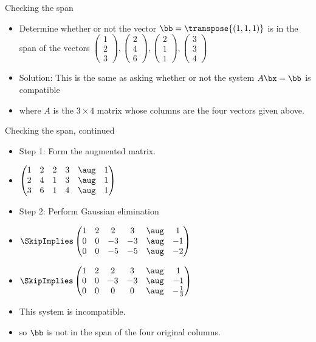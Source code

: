 \documentclass{beamer}
\begin{document}
\begin{frame}{Checking the span}
\begin{itemize}
\item Determine whether or not the vector
$\bb= \transpose{(1,1,1)}$
is in the span of the vectors
$
\begin{pmatrix}
1 \\
2 \\
3
\end{pmatrix},
\begin{pmatrix}
2\\
4\\
6
\end{pmatrix},
\begin{pmatrix}
2\\
1\\
1
\end{pmatrix},
\begin{pmatrix}
3 \\
3 \\
4
\end{pmatrix}
$
\item Solution: This is the same as asking whether or not the system $A\bx=\bb$
is compatible
\item where $A$ is the $3\times 4$ matrix whose columns are the four vectors given
above.
\end{itemize}
\end{frame}

\begin{frame}{Checking the span, continued}
\begin{itemize}
\item Step 1: Form the augmented matrix.
\item
$
\begin{pmatrix}
1 & 2 & 2 & 3  & \aug &  1 \\
2 & 4 & 1 & 3  & \aug &  1 \\
3 & 6 & 1 & 4  & \aug &  1
\end{pmatrix}
$
\item Step 2: Perform Gaussian elimination
\item
$
\SkipImplies
\begin{pmatrix}
1 & 2 & 2 &   3  & \aug &  1 \\
0 & 0 & -3 & -3  & \aug & -1 \\
0 & 0 & -5 & -5  & \aug & -2
\end{pmatrix}
$
\item
$
\SkipImplies
\begin{pmatrix}
1 & 2 &  2 &  3 &   \aug &  1 \\
0 & 0 & -3 & -3 &   \aug & -1 \\
0 & 0 &  0 &  0 &   \aug & -\frac{1}{3}
\end{pmatrix}
$
\item This system is incompatible.
\item so $\bb$ is not in the span of the four original columns.
\end{itemize}
\end{frame}
\end{document}
